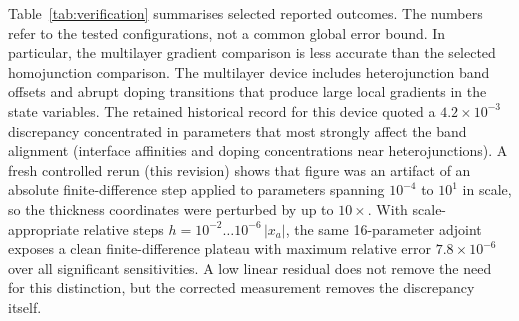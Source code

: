 Table~\ref{tab:verification} summarises selected reported outcomes. The
numbers refer to the tested configurations, not a common global error
bound. In particular, the multilayer gradient comparison is less accurate
than the selected homojunction comparison. The multilayer device includes
heterojunction band offsets and abrupt doping transitions that produce
large local gradients in the state variables. The retained historical
record for this device quoted a $4.2\times10^{-3}$ discrepancy
concentrated in parameters that most strongly affect the band alignment
(interface affinities and doping concentrations near heterojunctions).
A fresh controlled rerun (this revision) shows that figure was an artifact
of an absolute finite-difference step applied to parameters spanning
$10^{-4}$ to $10^{1}$ in scale, so the thickness coordinates were
perturbed by up to $10\times$. With scale-appropriate relative steps
$h=10^{-2}\dots10^{-6}\,|x_a|$, the same 16-parameter adjoint exposes a
clean finite-difference plateau with maximum relative error
$7.8\times10^{-6}$ over all significant sensitivities. A low linear
residual does not remove the need for this distinction, but the
corrected measurement removes the discrepancy itself.
